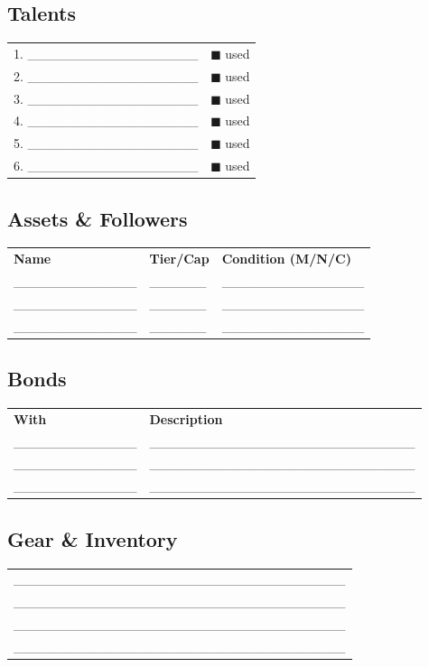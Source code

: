 \documentclass[11pt]{article}
\begin{document}
\subsection*{Talents}
\small
\begin{tabularx}{\textwidth}{X X}
1. __________________ & $■$ used \\
2. __________________ & $■$ used \\
3. __________________ & $■$ used \\
4. __________________ & $■$ used \\
5. __________________ & $■$ used \\
6. __________________ & $■$ used \\
\end{tabularx}
\normalsize

\subsection*{Assets & Followers}
\small
\begin{tabularx}{\textwidth}{p{3.5cm} p{2cm} X}
\textbf{Name} & \textbf{Tier/Cap} & \textbf{Condition (M/N/C)} \\
_____________ & ______ & _______________ \\
_____________ & ______ & _______________ \\
_____________ & ______ & _______________ \\
\end{tabularx}
\normalsize

\subsection*{Bonds}
\small
\begin{tabularx}{\textwidth}{p{5cm} X}
\textbf{With} & \textbf{Description} \\
_____________ & ____________________________ \\
_____________ & ____________________________ \\
_____________ & ____________________________ \\
\end{tabularx}
\normalsize

\subsection*{Gear & Inventory}
\small
\begin{tabularx}{\textwidth}{X}
___________________________________ \\
___________________________________ \\
___________________________________ \\
___________________________________ \\
\end{tabularx}
\end{document}
